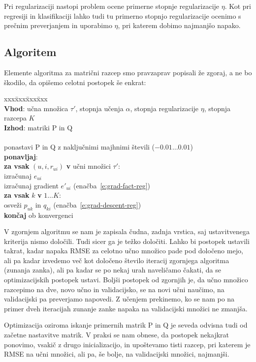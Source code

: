Pri regularizaciji nastopi problem ocene primerne stopnje regularizacije $\eta$. Kot pri regresiji in klasifikaciji lahko tudi tu primerno stopnjo regularizacije ocenimo s prečnim preverjanjem in uporabimo $\eta$, pri katerem dobimo najmanjšo napako.

\subsection{Algoritem}

Elemente algoritma za matrični razcep smo pravzaprav popisali že zgoraj, a ne bo škodilo, da opišemo celotni postopek še enkrat:

\begin{tabbing}
xxx\=xxx\=xxx\=xxx \kill\\
{\bf Vhod}: učna množica $\tau'$, stopnja učenja $\alpha$, stopnja regularizacije $\eta$, stopnja razcepa $K$ \\
{\bf Izhod}: matriki P in Q \\
\\
ponastavi P in Q z naključnimi majhnimi števili ($-0.01\ldots 0.01$) \\
{\bf ponavljaj}: \\
\> {\bf za vsak} $(u,i,r_{ui})$ {\bf v} učni množici $\tau'$:\\
\>\> izračunaj $e_{ui}$\\
\>\> izračunaj gradient $e'_{ui}$ (enačba~\ref{e:grad-fact-reg})\\
\>\> {\bf za vsak} $k$ {\bf v} $1\ldots K$:\\
\>\>\> osveži $p_{uk}$ in $q_{ki}$ (enačba~\ref{e:grad-descent-reg})\\
\> {\bf končaj} ob konvergenci\\
\end{tabbing}

V zgornjem algoritmu se nam je zapisala čudna, zadnja vrstica, saj ustavitvenega kriterija nismo določili. Tudi sicer ga je težko določiti. Lahko bi postopek ustavili takrat, kadar napaka RMSE za celotno učno množico pade pod določeno mejo, ali pa kadar izvedemo več kot določeno število iteracij zgornjega algoritma (zunanja zanka), ali pa kadar se po nekaj urah naveličamo čakati, da se optimizacijskih postopek ustavi. Boljši postopek od zgornjih je, da učno množico razcepimo na dve, novo učno in validacijsko, se na novi učni naučimo, na validacijski pa preverjamo napovedi. Z učenjem prekinemo, ko se nam po na primer dveh iteracijah zunanje zanke napaka na validacijski množici ne zmanjša.

Optimizacija oziroma iskanje primernih matrik P in Q je seveda odvisna tudi od začetne nastavitve matrik. V praksi se nam obnese, da postopek nekajkrat ponovimo, vsakič z drugo inicializacijo, in upoštevamo tisti razcep, pri katerem je RMSE na učni množici, ali pa, še bolje, na validacijski množici, najmanjši.
